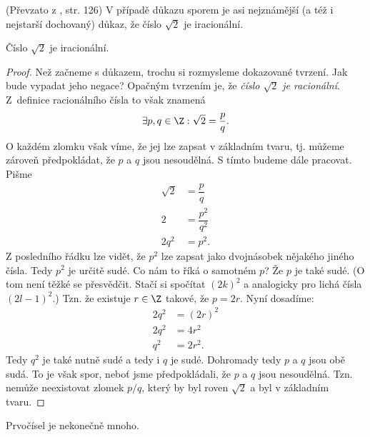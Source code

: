 (Převzato z \cite{ChartrandPolimeniZhang2014}, str. 126)
V případě důkazu sporem je asi nejznámější (a též i nejstarší dochovaný) důkaz, že číslo $\sqrt{2}$ je iracionální.
\begin{proposition}
    Číslo $\sqrt{2}$ je iracionální.
\end{proposition}
\begin{proof}
    Než začneme s důkazem, trochu si rozmysleme dokazované tvrzení. Jak bude vypadat jeho negace? Opačným tvrzením je, že \emph{číslo $\sqrt{2}$ je racionální}. Z~definice racionálního čísla to však znamená
    \begin{equation*}
        \exists p,q\in\Z : \sqrt{2}=\dfrac{p}{q}.
    \end{equation*}
    O každém zlomku však víme, že jej lze zapsat v základním tvaru, tj. můžeme zároveň předpokládat, že $p$ a $q$ jsou nesoudělná. S tímto budeme dále pracovat. Pišme
    \begin{align*}
        \sqrt{2}&=\dfrac{p}{q}\\
        2&=\dfrac{p^2}{q^2}\\
        2q^2&=p^2.
    \end{align*}
    Z posledního řádku lze vidět, že $p^2$ lze zapsat jako dvojnásobek nějakého jiného čísla. Tedy $p^2$ je určitě sudé. Co nám to říká o samotném $p$? Že $p$ je také sudé. (O tom není těžké se přesvědčit. Stačí si spočítat $(2k)^2$ a analogicky pro lichá čísla $(2l-1)^2$.) Tzn. že existuje $r\in\Z$ takové, že $p=2r$. Nyní dosadíme:
    \begin{align*}
        2q^2&=(2r)^2\\
        2q^2&=4r^2\\
        q^2&=2r^2.
    \end{align*}
    Tedy $q^2$ je také nutně sudé a tedy i $q$ je sudé. Dohromady tedy $p$ a $q$ jsou obě sudá. To je však spor, neboť jsme předpokládali, že $p$ a $q$ jsou nesoudělná. Tzn. nemůže neexistovat zlomek $p/q$, který by byl roven $\sqrt{2}$ a byl v základním tvaru.
\end{proof}
\begin{proposition}
    Prvočísel je nekonečně mnoho.
\end{proposition}
